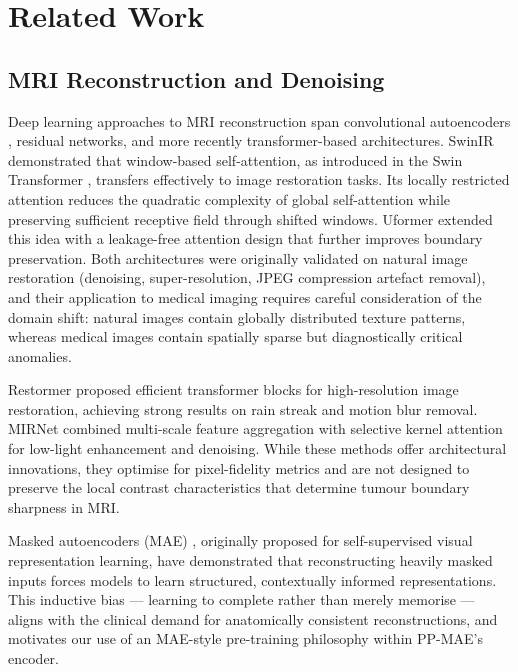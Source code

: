 \documentclass[conference]{IEEEtran}
\begin{document}
\section{Related Work}

\subsection{MRI Reconstruction and Denoising}

Deep learning approaches to MRI reconstruction span convolutional
autoencoders \cite{ronneberger2015unet}, residual networks, and
more recently transformer-based architectures. SwinIR \cite{liang2021swinir}
demonstrated that window-based self-attention, as introduced in
the Swin Transformer \cite{liu2021swin}, transfers effectively to
image restoration tasks. Its locally restricted attention reduces
the quadratic complexity of global self-attention while preserving
sufficient receptive field through shifted windows. Uformer
\cite{wang2022uformer} extended this idea with a leakage-free
attention design that further improves boundary preservation.
Both architectures were originally validated on natural image
restoration (denoising, super-resolution, JPEG compression artefact
removal), and their application to medical imaging requires careful
consideration of the domain shift: natural images contain globally
distributed texture patterns, whereas medical images contain
spatially sparse but diagnostically critical anomalies.

Restormer \cite{zamir2022restormer} proposed efficient transformer
blocks for high-resolution image restoration, achieving strong
results on rain streak and motion blur removal. MIRNet \cite{zamir2020mirnet}
combined multi-scale feature aggregation with selective kernel
attention for low-light enhancement and denoising. While these
methods offer architectural innovations, they optimise for
pixel-fidelity metrics and are not designed to preserve the
local contrast characteristics that determine tumour boundary
sharpness in MRI.

Masked autoencoders (MAE) \cite{he2022mae}, originally proposed for
self-supervised visual representation learning, have demonstrated
that reconstructing heavily masked inputs forces models to learn
structured, contextually informed representations. This inductive
bias — learning to complete rather than merely memorise — aligns
with the clinical demand for anatomically consistent reconstructions,
and motivates our use of an MAE-style pre-training philosophy within
PP-MAE's encoder.
\end{document}

